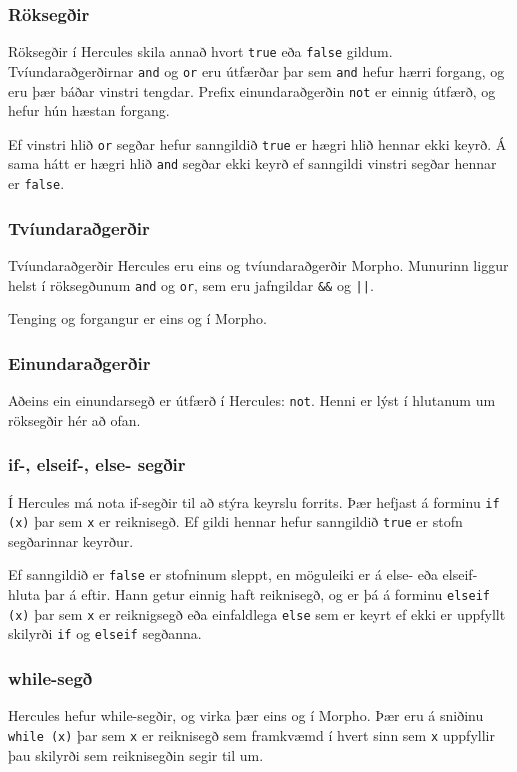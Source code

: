 \documentclass[12pt,a4paper]{article}
\begin{document}
\subsubsection{Röksegðir}
Röksegðir í Hercules skila annað hvort {\tt true} eða {\tt false} gildum. Tvíundaraðgerðirnar {\tt and} og {\tt or} eru útfærðar þar sem {\tt and} hefur hærri forgang,
og eru þær báðar vinstri tengdar. Prefix einundaraðgerðin {\tt not} er einnig útfærð, og hefur hún hæstan forgang.

Ef vinstri hlið {\tt or} segðar hefur sanngildið {\tt true} er hægri hlið hennar ekki keyrð. Á sama hátt er hægri hlið {\tt and} segðar ekki keyrð ef sanngildi
vinstri segðar hennar er {\tt false}.

\subsubsection{Tvíundaraðgerðir}
Tvíundaraðgerðir Hercules eru eins og tvíundaraðgerðir Morpho. Munurinn liggur helst í röksegðunum {\tt and} og {\tt or}, sem eru jafngildar {\tt \&\&} og {\tt ||}.

Tenging og forgangur er eins og í Morpho.

\subsubsection{Einundaraðgerðir}
Aðeins ein einundarsegð er útfærð í Hercules: {\tt not}. Henni er lýst í hlutanum um röksegðir hér að ofan.

\subsubsection{if-, elseif-, else- segðir}
Í Hercules má nota if-segðir til að stýra keyrslu forrits. Þær hefjast á forminu {\tt if (x)} þar sem {\tt x} er reiknisegð. Ef gildi hennar hefur sanngildið {\tt true} er stofn
segðarinnar keyrður.

Ef sanngildið er {\tt false} er stofninum sleppt, en möguleiki er á else- eða elseif- hluta þar á eftir. Hann getur einnig haft reiknisegð, og er þá á forminu {\tt elseif (x)} þar sem {\tt x} er reiknigsegð eða einfaldlega {\tt else} sem er keyrt ef ekki er uppfyllt skilyrði {\tt if} og {\tt elseif} segðanna.

\subsubsection{while-segð}
Hercules hefur while-segðir, og virka þær eins og í Morpho. Þær eru á sniðinu {\tt while (x)} þar sem {\tt x} er reiknisegð sem framkvæmd í hvert sinn sem {\tt x} uppfyllir þau skilyrði sem reiknisegðin segir til um.
\end{document}
